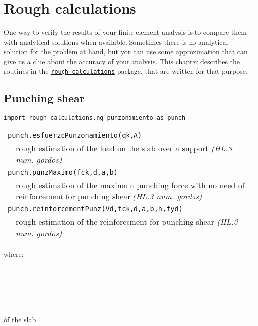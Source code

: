 \chapter{Rough calculations}
One way to verify the results of your finite element analysis is to compare them with analytical solutions when available. Sometimes there is no analytical solution for the problem at hand, but you can use some approximation that can give us a clue about the accuracy of your analysis. This chapter describes the routines in the \href{https://github.com/xcfem/xc/tree/master/python_modules/rough_calculations}{\tt rough\_calculations} package, that are written for that purpose. 

\section{Punching shear}
\begin{verbatim}
import rough_calculations.ng_punzonamiento as punch
\end{verbatim}
\begin{center}
\begin{tabular}{p{3cm}p{9.5cm}}
\multicolumn{2}{l}{{\tt punch.esfuerzoPunzonamiento(qk,A)}} \\
& rough estimation of the load on the slab over a support \emph{(HL.3 num. gordos)}\\
\multicolumn{2}{l}{{\tt punch.punzMaximo(fck,d,a,b)}} \\
& rough estimation of the maximum punching force with no need of reinforcement for punching shear  \emph{(HL.3 num. gordos)}\\
\multicolumn{2}{l}{{\tt punch.reinforcementPunz(Vd,fck,d,a,b,h,fyd)}} \\
& rough estimation of the reinforcement for punching shear  \emph{(HL.3 num. gordos)} \\
\end{tabular}
\end{center}

where:
\begin{paramFuncTable}
\qkSlab{} \\
\ASupport{} \\
\fck{}\\
 \\
\abSupport{} \\
\h{of the slab} \\
 \\
\end{paramFuncTable}

